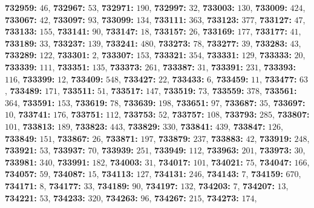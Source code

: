 \textsf{\bfseries 732959:} $46$, \textsf{\bfseries 732967:} $53$, \textsf{\bfseries 732971:} $190$, \textsf{\bfseries 732997:} $32$, \textsf{\bfseries 733003:} $130$, \textsf{\bfseries 733009:} $424$, \textsf{\bfseries 733067:} $42$, \textsf{\bfseries 733097:} $93$, \textsf{\bfseries 733099:} $134$, \textsf{\bfseries 733111:} $363$, \textsf{\bfseries 733123:} $377$, \textsf{\bfseries 733127:} $47$, \textsf{\bfseries 733133:} $155$, \textsf{\bfseries 733141:} $90$, \textsf{\bfseries 733147:} $18$, \textsf{\bfseries 733157:} $26$, \textsf{\bfseries 733169:} $177$, \textsf{\bfseries 733177:} $41$, \textsf{\bfseries 733189:} $33$, \textsf{\bfseries 733237:} $139$, \textsf{\bfseries 733241:} $480$, \textsf{\bfseries 733273:} $78$, \textsf{\bfseries 733277:} $39$, \textsf{\bfseries 733283:} $43$, \textsf{\bfseries 733289:} $122$, \textsf{\bfseries 733301:} $2$, \textsf{\bfseries 733307:} $153$, \textsf{\bfseries 733321:} $354$, \textsf{\bfseries 733331:} $129$, \textsf{\bfseries 733333:} $20$, \textsf{\bfseries 733339:} $111$, \textsf{\bfseries 733351:} $135$, \textsf{\bfseries 733373:} $261$, \textsf{\bfseries 733387:} $31$, \textsf{\bfseries 733391:} $231$, \textsf{\bfseries 733393:} $116$, \textsf{\bfseries 733399:} $12$, \textsf{\bfseries 733409:} $548$, \textsf{\bfseries 733427:} $22$, \textsf{\bfseries 733433:} $6$, \textsf{\bfseries 733459:} $11$, \textsf{\bfseries 733477:} $63$, \textsf{\bfseries 733489:} $171$, \textsf{\bfseries 733511:} $51$, \textsf{\bfseries 733517:} $147$, \textsf{\bfseries 733519:} $73$, \textsf{\bfseries 733559:} $378$, \textsf{\bfseries 733561:} $364$, \textsf{\bfseries 733591:} $153$, \textsf{\bfseries 733619:} $78$, \textsf{\bfseries 733639:} $198$, \textsf{\bfseries 733651:} $97$, \textsf{\bfseries 733687:} $35$, \textsf{\bfseries 733697:} $10$, \textsf{\bfseries 733741:} $176$, \textsf{\bfseries 733751:} $112$, \textsf{\bfseries 733753:} $52$, \textsf{\bfseries 733757:} $108$, \textsf{\bfseries 733793:} $285$, \textsf{\bfseries 733807:} $101$, \textsf{\bfseries 733813:} $189$, \textsf{\bfseries 733823:} $443$, \textsf{\bfseries 733829:} $330$, \textsf{\bfseries 733841:} $439$, \textsf{\bfseries 733847:} $126$, \textsf{\bfseries 733849:} $151$, \textsf{\bfseries 733867:} $26$, \textsf{\bfseries 733871:} $197$, \textsf{\bfseries 733879:} $237$, \textsf{\bfseries 733883:} $42$, \textsf{\bfseries 733919:} $248$, \textsf{\bfseries 733921:} $53$, \textsf{\bfseries 733937:} $70$, \textsf{\bfseries 733939:} $251$, \textsf{\bfseries 733949:} $112$, \textsf{\bfseries 733963:} $201$, \textsf{\bfseries 733973:} $30$, \textsf{\bfseries 733981:} $340$, \textsf{\bfseries 733991:} $182$, \textsf{\bfseries 734003:} $31$, \textsf{\bfseries 734017:} $101$, \textsf{\bfseries 734021:} $75$, \textsf{\bfseries 734047:} $166$, \textsf{\bfseries 734057:} $59$, \textsf{\bfseries 734087:} $15$, \textsf{\bfseries 734113:} $127$, \textsf{\bfseries 734131:} $246$, \textsf{\bfseries 734143:} $7$, \textsf{\bfseries 734159:} $670$, \textsf{\bfseries 734171:} $8$, \textsf{\bfseries 734177:} $33$, \textsf{\bfseries 734189:} $90$, \textsf{\bfseries 734197:} $132$, \textsf{\bfseries 734203:} $7$, \textsf{\bfseries 734207:} $13$, \textsf{\bfseries 734221:} $53$, \textsf{\bfseries 734233:} $320$, \textsf{\bfseries 734263:} $96$, \textsf{\bfseries 734267:} $215$, \textsf{\bfseries 734273:} $174$, 
